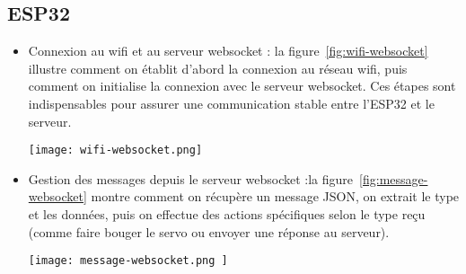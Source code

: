 \subsection{ESP32}
\begin{itemize}
	\item Connexion au wifi et au serveur websocket : la figure~\ref{fig:wifi-websocket} illustre comment on établit d’abord la connexion au réseau wifi, puis comment on initialise la connexion avec le serveur websocket. Ces étapes sont indispensables pour assurer une communication stable entre l’ESP32 et le serveur.
	
	\begin{minipage}{\linewidth}
  		\centering
  		\texttt{[image: wifi-websocket.png]}
  		\label{fig:wifi-websocket}
	\end{minipage}
	
	
	\item Gestion des messages depuis le serveur websocket :la figure~\ref{fig:message-websocket} montre comment on récupère un message JSON, on extrait le type et les données, puis on effectue des actions spécifiques selon le type reçu (comme faire bouger le servo ou envoyer une réponse au serveur).\\
	\begin{minipage}{\linewidth}
  		\centering
  		\texttt{[image: message-websocket.png	]}
  		\label{fig:message-websocket}
	\end{minipage}
\end{itemize}



